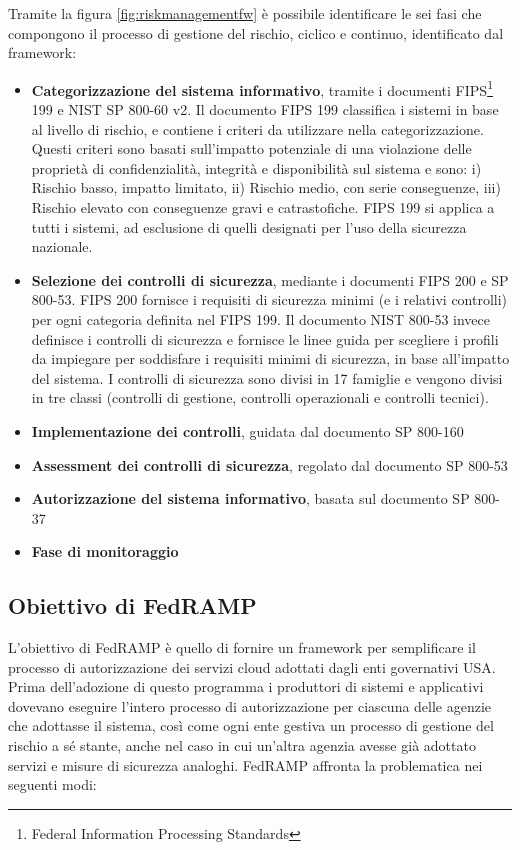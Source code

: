 \documentclass[../main.tex]{subfiles}
\begin{document}
Tramite la figura \ref{fig:riskmanagementfw} è possibile identificare le sei fasi che compongono il processo di gestione del rischio, ciclico e continuo, identificato dal framework:

\begin{itemize}
    \item \textbf{Categorizzazione del sistema informativo}, tramite i documenti FIPS\footnote{Federal Information Processing Standards} 199 e NIST SP 800-60 v2\cite{nist80060}. Il documento FIPS 199 classifica i sistemi in base al livello di rischio, e contiene i criteri da utilizzare nella categorizzazione. Questi criteri sono basati sull'impatto potenziale di una violazione delle proprietà di confidenzialità, integrità e disponibilità sul sistema e sono: i) Rischio basso, impatto limitato, ii) Rischio medio, con serie conseguenze, iii) Rischio elevato con conseguenze gravi e catrastofiche. FIPS 199 si applica a tutti i sistemi, ad esclusione di quelli designati per l'uso della sicurezza nazionale.
    \item \textbf{Selezione dei controlli di sicurezza}, mediante i documenti FIPS 200 e SP 800-53. FIPS 200 fornisce i requisiti di sicurezza minimi (e i relativi controlli) per ogni categoria definita nel FIPS 199.
        Il documento NIST 800-53\cite{nist2003nist} invece definisce i controlli di sicurezza e fornisce le linee guida per scegliere i profili da impiegare per soddisfare i requisiti minimi di sicurezza, in base all'impatto del sistema. I controlli di sicurezza sono divisi in 17 famiglie e vengono divisi in tre classi (controlli di gestione, controlli operazionali e controlli tecnici). 
    \item \textbf{Implementazione dei controlli}, guidata dal documento SP 800-160\cite{nist800160}
    \item \textbf{Assessment dei controlli di sicurezza}, regolato dal documento SP 800-53\cite{nist2003nist}
    \item \textbf{Autorizzazione del sistema informativo}, basata sul documento SP 800-37\cite{nist80037}
    \item \textbf{Fase di monitoraggio}\cite{nist800137}        
\end{itemize}

\subsection{Obiettivo di FedRAMP}
L'obiettivo di FedRAMP è quello di fornire un framework per semplificare il processo di autorizzazione dei servizi cloud adottati dagli enti governativi USA.
Prima dell'adozione di questo programma i produttori di sistemi e applicativi dovevano eseguire l'intero processo di autorizzazione per ciascuna delle agenzie che adottasse il sistema, così come ogni ente gestiva un processo di gestione del rischio a sé stante, anche nel caso in cui un'altra agenzia avesse già adottato servizi e misure di sicurezza analoghi. 
FedRAMP affronta la problematica nei seguenti modi\cite{understandingFedRAMP}:
\end{document}
